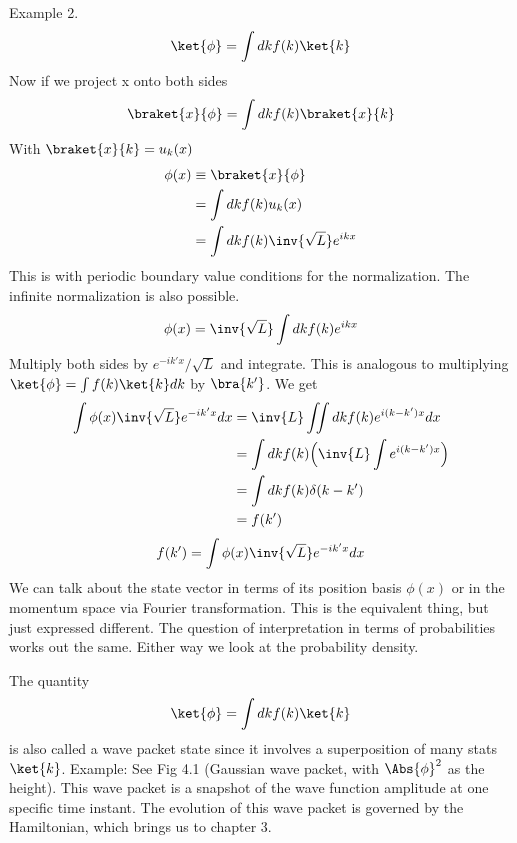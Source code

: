 Example 2.
\begin{equation}\label{eqn:lecture5BigReviewCh2Operators:60}
\ket{\phi} = \int dk f(k) \ket{k}
\end{equation}
%
Now if we project x onto both sides
%
\begin{equation}\label{eqn:lecture5BigReviewCh2Operators:80}
\braket{x}{\phi}
= \int dk f(k) \braket{x}{k}
\end{equation}
%
With \(\braket{x}{k} = u_k(x)\)
%
\begin{equation}\label{eqn:lecture5BigReviewCh2Operators:100}
\begin{aligned}
\phi(x)
&\equiv \braket{x}{\phi} \\
&= \int dk f(k) u_k(x)  \\
&= \int dk f(k) \inv{\sqrt{L}} e^{ikx}
\end{aligned}
\end{equation}
%
This is with periodic boundary value conditions for the normalization.  The infinite normalization is also possible.
%
\begin{equation}\label{eqn:lecture5BigReviewCh2Operators:120}
\phi(x)
= \inv{\sqrt{L}} \int dk f(k) e^{ikx}
\end{equation}
%
Multiply both sides by \(e^{-ik'x}/\sqrt{L}\) and integrate.  This is analogous to multiplying \(\ket{\phi} = \int f(k) \ket{k} dk\) by \(\bra{k'}\).  We get
%
\begin{equation}\label{eqn:lecture5BigReviewCh2Operators:140}
\begin{aligned}
\int \phi(x) \inv{\sqrt{L}} e^{-ik'x} dx
&= \inv{L} \iint dk f(k) e^{i(k-k')x} dx \\
&= \int dk f(k) \Bigl( \inv{L} \int e^{i(k-k')x} \Bigr) \\
&= \int dk f(k) \delta(k-k') \\
&= f(k')
\end{aligned}
\end{equation}
%
\begin{equation}\label{eqn:lecture5BigReviewCh2Operators:160}
f(k') = \int \phi(x) \inv{\sqrt{L}} e^{-ik'x} dx
\end{equation}
%
We can talk about the state vector in terms of its position basis \(\phi(x)\) or in the momentum space via Fourier transformation.  This is the equivalent thing, but just expressed different.  The question of interpretation in terms of probabilities works out the same.  Either way we look at the probability density.

The quantity
%
\begin{equation}\label{eqn:lecture5BigReviewCh2Operators:180}
\ket{\phi} = \int dk f(k) \ket{k}
\end{equation}
%
is also called a wave packet state since it involves a superposition of many stats \(\ket{k}\).  Example: See Fig 4.1 (Gaussian wave packet, with \(\Abs{\phi}^2\) as the height).  This wave packet is a snapshot of the wave function amplitude at one specific time instant.  The evolution of this wave packet is governed by the Hamiltonian, which brings us to chapter 3.

